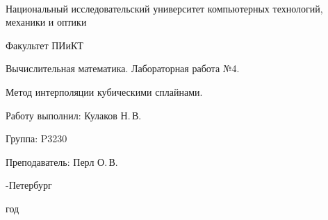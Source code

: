 \thispagestyle{empty}

\onecolumn
\begin{center}
	\
\vspace{1 cm}

\huge Национальный исследовательский университет компьютерных технологий, механики и оптики
\vspace{0.5cm}

\Huge Факультет ПИиКТ


\vspace{5cm}
\huge Вычислительная математика. Лабораторная работа №4.
\vspace{0.2cm}

\LARGE Метод интерполяции кубическими сплайнами.
\end{center}
\vspace{5 cm}

\begin{flushright}
\Large

Работу выполнил: Кулаков Н.\,В.
\smallskip

Группа: P3230
\smallskip

Преподаватель: Перл О.\,В.
\smallskip

\vspace{4cm}
	
-Петербург

 год
\end{flushright}
